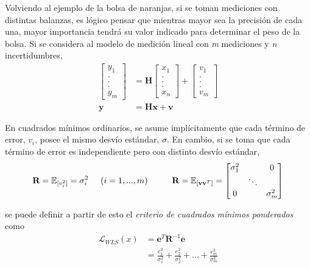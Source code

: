 Volviendo al ejemplo de la bolsa de naranjas, si se toman mediciones con distintas balanzas, es lógico pensar que mientras mayor sea la precisión de cada una, mayor importancia tendrá su valor indicado para determinar el peso de la bolsa. Si se considera al modelo de medición lineal con \textit{m} mediciones y \textit{n} incertidumbres,
\begin{align}
    \begin{bmatrix}
        y_1 \\ . \\ . \\ . \\ y_m
    \end{bmatrix}
    &=
    \textbf{H}
    \begin{bmatrix}
        x_1 \\ . \\ . \\ . \\ x_n
    \end{bmatrix}
    +
    \begin{bmatrix}
        v_1 \\ .\\ . \\ . \\ v_m
    \end{bmatrix} \\
    \textbf{y} &= \textbf{H} \textbf{x} + \textbf{v}
\end{align}

En cuadrados mínimos ordinarios, se asume implícitamente que cada término de error, $v_i$, posee el mismo desvío estándar, $\sigma$. En cambio, si se toma que cada término de error es independiente pero con distinto desvío estándar,
\begin{equation}
    \textbf{R} = \mathbb{E}_{[v_i^2]} = \sigma_i^2 \hspace{0.5cm}(i=1,...,m)\hspace{1cm}\textbf{R}=\mathbb{E}_{[\textbf{v}\textbf{v}^T]} = 
    \begin{bmatrix}
        \sigma_1^2  &        &     0      \\
                    & \ddots &            \\
            0       &        & \sigma_m^2
    \end{bmatrix}
\end{equation}

se puede definir a partir de esto el \textit{criterio de cuadrados mínimos ponderados} como
\begin{align}
    \mathscr{L}_{WLS}(x) &= \textbf{e}^T\textbf{R}^{-1}\textbf{e} \\
                         &= \frac{e_1^2}{\sigma_1^2} + \frac{e_2^2}{\sigma_2^2} + ... + \frac{e_m^2}{\sigma_m^2}
\end{align}

